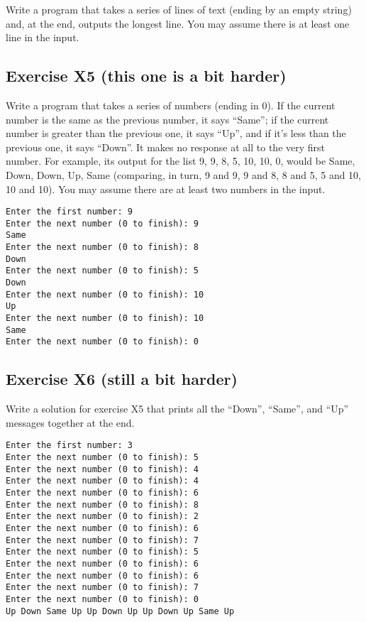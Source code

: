 Write a program that takes a series of lines of text (ending by 
an empty string) and,
at the end, outputs the longest line.
You may assume there is at least one line in the input.

\pagebreak


\subsection*{Exercise X5 (this one is a bit harder)}

Write a program that takes
a series of numbers (ending in 0).  If the
current number is the same as the previous number, it says ``Same'';
if the current number is greater than the previous one, it says ``Up'',
and if it's less than the previous one, it says ``Down''.
It makes no response at all to the
very first number.  For example, its output for the list 9, 9, 8, 5,
10, 10, 0,
would be Same, Down, Down, Up, Same
(comparing, in turn, 9 and 9, 9 and 8, 8 and 5, 5 and 10, 10 and 10).
You may assume there are at least two numbers in the input.

\begin{verbatim}
Enter the first number: 9
Enter the next number (0 to finish): 9
Same
Enter the next number (0 to finish): 8
Down
Enter the next number (0 to finish): 5
Down
Enter the next number (0 to finish): 10
Up
Enter the next number (0 to finish): 10
Same
Enter the next number (0 to finish): 0
\end{verbatim}

\subsection*{Exercise X6 (still a bit harder)}

Write a solution for exercise X5 that prints all the ``Down'',
``Same'', and ``Up'' messages together at the end. 

\begin{verbatim}
Enter the first number: 3
Enter the next number (0 to finish): 5
Enter the next number (0 to finish): 4
Enter the next number (0 to finish): 4
Enter the next number (0 to finish): 6
Enter the next number (0 to finish): 8
Enter the next number (0 to finish): 2
Enter the next number (0 to finish): 6
Enter the next number (0 to finish): 7
Enter the next number (0 to finish): 5
Enter the next number (0 to finish): 6
Enter the next number (0 to finish): 6
Enter the next number (0 to finish): 7
Enter the next number (0 to finish): 0
Up Down Same Up Up Down Up Up Down Up Same Up 
\end{verbatim}



